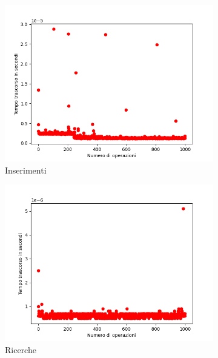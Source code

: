 \documentclass{article}
\begin{document}
			\begin{figure}[h]
				\centering
				
				\begin{subfigure}{0.49\textwidth}
					\centering
					\includegraphics[width = \textwidth]{HMM_Insertions}
					\caption{Inserimenti}
				\end{subfigure}
				\begin{subfigure}{0.49\textwidth}
					\centering
					\includegraphics[width = \textwidth]{HMM_Searches}
					\caption{Ricerche}
				\end{subfigure}
				\begin{subfigure}{0.49\textwidth}
					\centering

\end{subfigure}
\end{figure}
\end{document}
